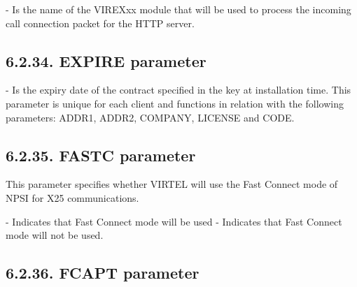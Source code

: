 \documentclass[letterpaper,10pt,english]{sphinxmanual}
\begin{document}
 - Is the name of the VIREXxx module that will be used to process the incoming call connection packet for the HTTP server.


\subsection{6.2.34. EXPIRE parameter}
\label{\detokenize{Installation_Guide:expire-parameter}}
\begin{sphinxVerbatim}[commandchars=\\\{\}]
 
\end{sphinxVerbatim}

 - Is the expiry date of the contract specified in the key at installation time. This parameter is unique for each client and functions in relation with the following parameters: ADDR1, ADDR2, COMPANY, LICENSE and CODE.


\subsection{6.2.35. FASTC parameter}
\label{\detokenize{Installation_Guide:fastc-parameter}}
\begin{sphinxVerbatim}[commandchars=\\\{\}]
 
\end{sphinxVerbatim}

This parameter specifies whether VIRTEL will use the Fast Connect mode of NPSI for X25 communications.

 - Indicates that Fast Connect mode will be used
 - Indicates that Fast Connect mode will not be used.


\subsection{6.2.36. FCAPT parameter}
\label{\detokenize{Installation_Guide:fcapt-parameter}}
\begin{sphinxVerbatim}[commandchars=\\\{\}]
  
\end{sphinxVerbatim}
\end{document}
